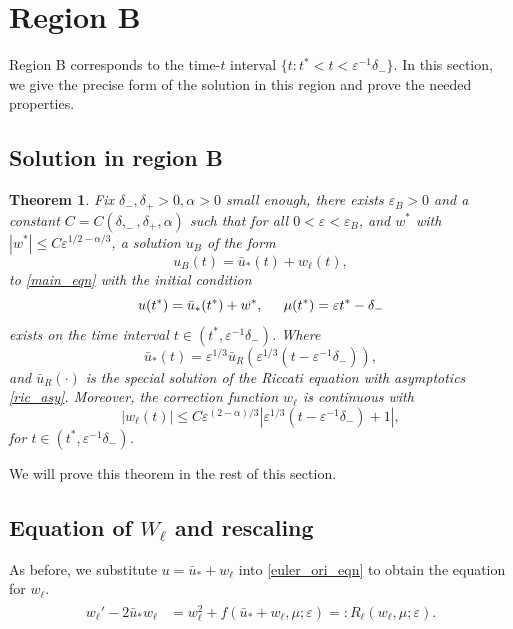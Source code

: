 \documentclass[letterpaper,11pt]{article}
\newcommand{\eps}{\varepsilon}
\numberwithin{equation}{section}
\theoremstyle{plain}
\newtheorem{Theorem}{Theorem}
\begin{document}
\section{Region B}\label{sec_B}

Region B corresponds to the time-$t$ interval $ \{t: t^*< t< \eps^{-1}\delta_-\}$. In this section, we give the precise form of the solution in this region and prove the needed properties.

\subsection{Solution in region B}

\begin{Theorem}\label{thm:l}
Fix $\delta_-, \delta_+>0, \alpha>0$ small enough, there exists $\eps_B>0$ and a constant $C=C(\delta,_-,\delta_+,\alpha)$ such that for all $0<\eps <\eps_B$, and $w^*$ with $|w^*| \le  C\eps^{1/2-\alpha/3}$, a solution $u_B$ of the form 
\begin{equation}
u_B(t) = \bar{u}_*(t) + w_\ell(t),
\end{equation} to \eqref{main_eqn} with the initial condition
\begin{equation}\label{ul_ic}
u(t^*) = \bar{u}_*(t^*) + w^*, \hspace{0.2in}\mu(t^*) = \eps t^* -\delta_-
\end{equation}
exists on the time interval $t \in (t^*, \eps^{-1}\delta_-)$. Where 
\[
\bar{u}_*(t) = \eps^{1/3}\bar{u}_R(\eps^{1/3}(t-\eps^{-1}\delta_-)),
\] 
and $\bar{u}_R(\cdot)$ is the special solution of the Riccati equation with asymptotics \eqref{ric_asy}. Moreover, the correction function $w_\ell$ is continuous with
\begin{equation}\label{thm:l_1}
|w_\ell(t)| \le C\eps^{(2-\alpha)/3} | \eps^{1/3}(t-\eps^{-1}\delta_-)+1|,
\end{equation}
for $t \in (t^*, \eps^{-1}\delta_-)$.
\end{Theorem}

We will prove this theorem in the rest of this section.
\subsection{Equation of \texorpdfstring{$W_{\ell}$}{Well} and rescaling}

As before, we substitute $u=\bar{u}_*+w_\ell$ into \eqref{euler_ori_eqn} to obtain the equation for $w_\ell$.
\begin{align}\label{Eqn_wl}
\begin{split}
w_{\ell}' -2\bar{u}_* w_\ell &= w_\ell^2 + f(\bar{u}_*+w_\ell, \mu; \eps) =: R_\ell(w_\ell,\mu;\eps).
\end{split}
\end{align}
\end{document}
